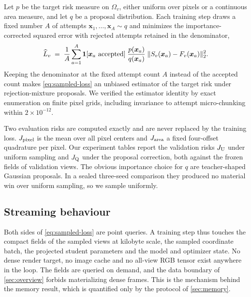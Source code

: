 Let $p$ be the target risk measure on $\Omega_v$, either uniform over pixels or a
continuous area measure, and let $q$ be a proposal distribution.  Each training step draws
a fixed number $A$ of attempts $\bm{x}_1, \dots, \bm{x}_A \sim q$ and minimizes the
importance-corrected squared error with rejected attempts retained in the denominator,
\begin{equation}
  \widehat{L}_v \;=\;
  \frac{1}{A} \sum_{a=1}^{A}
  \mathbf{1}[\bm{x}_a \text{ accepted}]\;
  \frac{p(\bm{x}_a)}{q(\bm{x}_a)}\;
  \lVert S_v(\bm{x}_a) - F_v(\bm{x}_a)\rVert_2^2 .
  \label{eq:sampled-loss}
\end{equation}
Keeping the denominator at the fixed attempt count $A$ instead of the accepted count makes
\cref{eq:sampled-loss} an unbiased estimator of the target risk under rejection-mixture
proposals.  We verified the estimator identity by exact enumeration on finite pixel
grids, including invariance to attempt micro-chunking within
$2\times10^{-12}$.

Two evaluation risks are computed exactly and are never replaced by the training loss.
$J_{\mathrm{pixel}}$ is the mean over all pixel centers and $J_{\mathrm{area}}$ a fixed four-offset quadrature per
pixel.  Our experiment tables report the validation risks $J_{\mathrm{U}}$ under uniform sampling and
$J_{\mathrm{Q}}$ under the proposal correction, both against the frozen fields of validation
views.
The obvious importance choice for $q$ are teacher-shaped Gaussian proposals.  In a sealed
three-seed comparison they produced no material win over uniform sampling, so we sample
uniformly.

\subsection{Streaming behaviour}
\label{sec:streaming}

Both sides of \cref{eq:sampled-loss} are point queries.  A training step thus touches the
compact fields of the sampled views at kilobyte scale, the sampled coordinate batch, the
projected student parameters and the model and optimizer state.  No dense render target,
no image cache and no all-view RGB tensor exist anywhere in the loop.  The fields are
queried on demand, and the data boundary of \cref{sec:overview} forbids materializing
dense frames.  This is the mechanism behind the memory result, which is quantified only by
the protocol of \cref{sec:memory}.

